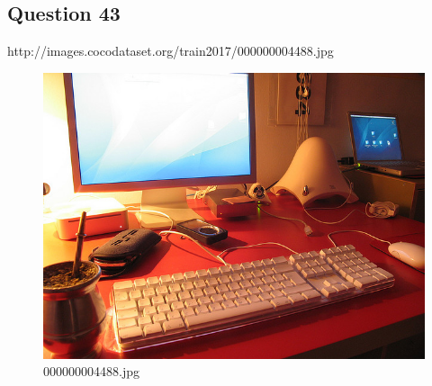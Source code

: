 \subsection*{Question 43}
http://images.cocodataset.org/train2017/000000004488.jpg
\begin{figure}[h]
    \centering
    \includegraphics[width=0.8\linewidth]{../image set/hard/000000004488.jpg}
    \caption{000000004488.jpg}
\end{figure}
